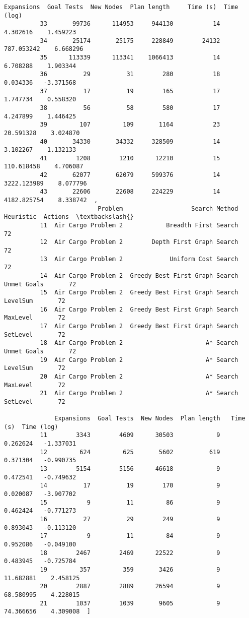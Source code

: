 \documentclass[11pt]{article}
\begin{document}
\begin{Verbatim}[commandchars=\\\{\}]
              Expansions  Goal Tests  New Nodes  Plan length     Time (s)  Time (log)  
          33       99736      114953     944130           14     4.302616    1.459223  
          34       25174       25175     228849        24132   787.053242    6.668296  
          35      113339      113341    1066413           14     6.708288    1.903344  
          36          29          31        280           18     0.034336   -3.371568  
          37          17          19        165           17     1.747734    0.558320  
          38          56          58        580           17     4.247899    1.446425  
          39         107         109       1164           23    20.591328    3.024870  
          40       34330       34332     328509           14     3.102267    1.132133  
          41        1208        1210      12210           15   110.618458    4.706087  
          42       62077       62079     599376           14  3222.123989    8.077796  
          43       22606       22608     224229           14  4182.825754    8.338742  ,
                          Problem                   Search Method    Heuristic  Actions  \textbackslash{}
          11  Air Cargo Problem 2            Breadth First Search                    72   
          12  Air Cargo Problem 2        Depth First Graph Search                    72   
          13  Air Cargo Problem 2             Uniform Cost Search                    72   
          14  Air Cargo Problem 2  Greedy Best First Graph Search  Unmet Goals       72   
          15  Air Cargo Problem 2  Greedy Best First Graph Search     LevelSum       72   
          16  Air Cargo Problem 2  Greedy Best First Graph Search     MaxLevel       72   
          17  Air Cargo Problem 2  Greedy Best First Graph Search     SetLevel       72   
          18  Air Cargo Problem 2                       A* Search  Unmet Goals       72   
          19  Air Cargo Problem 2                       A* Search     LevelSum       72   
          20  Air Cargo Problem 2                       A* Search     MaxLevel       72   
          21  Air Cargo Problem 2                       A* Search     SetLevel       72   
          
              Expansions  Goal Tests  New Nodes  Plan length   Time (s)  Time (log)  
          11        3343        4609      30503            9   0.262624   -1.337031  
          12         624         625       5602          619   0.371304   -0.990735  
          13        5154        5156      46618            9   0.472541   -0.749632  
          14          17          19        170            9   0.020087   -3.907702  
          15           9          11         86            9   0.462424   -0.771273  
          16          27          29        249            9   0.893043   -0.113120  
          17           9          11         84            9   0.952086   -0.049100  
          18        2467        2469      22522            9   0.483945   -0.725784  
          19         357         359       3426            9  11.682881    2.458125  
          20        2887        2889      26594            9  68.580995    4.228015  
          21        1037        1039       9605            9  74.366656    4.309008  ]
\end{Verbatim}
            
\end{document}
